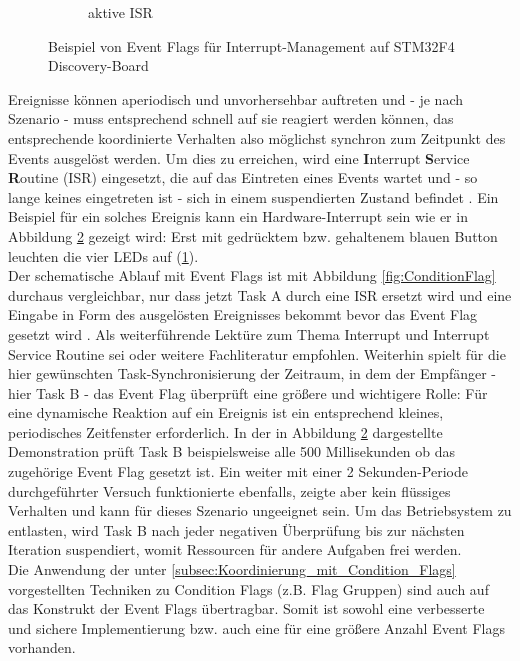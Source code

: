 \documentclass{llncs}
\begin{document}
\begin{figure}
\begin{subfigure}{.250\textwidth}
		\caption{aktive ISR}
		\label{fig:EventFlagAn}
	\end{subfigure}
	\caption{Beispiel von Event Flags für Interrupt-Management auf STM32F4 Discovery-Board}
	\label{fig:EventFlagBeispiel}
\end{figure}

Ereignisse können aperiodisch und unvorhersehbar auftreten und - je nach Szenario - muss entsprechend schnell auf sie reagiert werden können, das entsprechende koordinierte Verhalten also möglichst synchron zum Zeitpunkt des Events ausgelöst werden. Um dies zu erreichen, wird eine \textbf{I}nterrupt \textbf{S}ervice \textbf{R}outine (ISR) eingesetzt, die auf das Eintreten eines Events wartet und - so lange keines eingetreten ist - sich in einem suspendierten Zustand befindet \autocite[vgl.][87]{Cooling2017}. Ein Beispiel für ein solches Ereignis kann ein Hardware-Interrupt sein wie er in Abbildung \ref{fig:EventFlagBeispiel} gezeigt wird: Erst mit gedrücktem bzw. gehaltenem blauen Button leuchten die vier LEDs auf (\ref{fig:EventFlagAn}).\\

Der schematische Ablauf mit Event Flags ist mit Abbildung \ref{fig:ConditionFlag} durchaus vergleichbar, nur dass jetzt Task A durch eine ISR ersetzt wird und eine Eingabe in Form des ausgelösten Ereignisses bekommt bevor das Event Flag gesetzt wird \autocite[vgl.][87]{Cooling2017}. Als weiterführende Lektüre zum Thema Interrupt und Interrupt Service Routine sei \autocite{MikrocontrollerInterrupt} oder weitere Fachliteratur empfohlen. Weiterhin spielt für die hier gewünschten Task-Synchronisierung der Zeitraum, in dem der Empfänger - hier Task B - das Event Flag überprüft eine größere und wichtigere Rolle: Für eine dynamische Reaktion auf ein Ereignis ist ein entsprechend kleines, periodisches Zeitfenster erforderlich. In der in Abbildung \ref{fig:EventFlagBeispiel} dargestellte Demonstration prüft Task B beispielsweise alle 500 Millisekunden ob das zugehörige Event Flag gesetzt ist. Ein weiter mit einer 2 Sekunden-Periode durchgeführter Versuch funktionierte ebenfalls, zeigte aber kein flüssiges Verhalten und kann für dieses Szenario ungeeignet sein. Um das Betriebsystem zu entlasten, wird Task B nach jeder negativen Überprüfung bis zur nächsten Iteration suspendiert, womit Ressourcen für andere Aufgaben frei werden.\\ 

Die Anwendung der unter \ref{subsec:Koordinierung_mit_Condition_Flags} vorgestellten Techniken zu Condition Flags (z.B. Flag Gruppen) sind auch auf das Konstrukt der Event Flags übertragbar. Somit ist sowohl eine verbesserte und sichere Implementierung bzw. auch eine für eine größere Anzahl Event Flags vorhanden.\\
\end{document}
